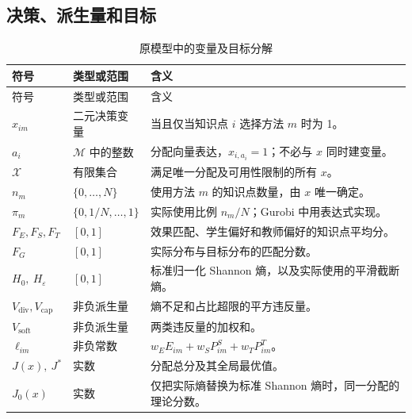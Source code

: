\documentclass[UTF8,11pt,a4paper,fontset=fandol]{ctexart}
\newcommand{\M}{\mathcal M}
\newcommand{\X}{\mathcal X}
\begin{document}
\subsection{决策、派生量和目标}
\small
\begin{longtable}{p{}p{}p{}}
\caption{原模型中的变量及目标分解}\\
\toprule 符号 & 类型或范围 & 含义 \\ \midrule\endfirsthead
\toprule 符号 & 类型或范围 & 含义 \\ \midrule\endhead
\bottomrule\endfoot
$x_{im}$ & 二元决策变量 & 当且仅当知识点 $i$ 选择方法 $m$ 时为 1。\\
$a_i$ & $\M$ 中的整数 & 分配向量表达，$x_{i,a_i}=1$；不必与 $x$ 同时建变量。\\
$\X$ & 有限集合 & 满足唯一分配及可用性限制的所有 $x$。\\
$n_m$ & $\{0,\ldots,N\}$ & 使用方法 $m$ 的知识点数量，由 $x$ 唯一确定。\\
$\pi_m$ & $\{0,1/N,\ldots,1\}$ & 实际使用比例 $n_m/N$；Gurobi 中用表达式实现。\\
$F_E,F_S,F_T$ & $[0,1]$ & 效果匹配、学生偏好和教师偏好的知识点平均分。\\
$F_G$ & $[0,1]$ & 实际分布与目标分布的匹配分数。\\
$H_0,\ H_\varepsilon$ & $[0,1]$ & 标准归一化 Shannon 熵，以及实际使用的平滑截断熵。\\
$V_{\mathrm{div}},V_{\mathrm{cap}}$ & 非负派生量 & 熵不足和占比超限的平方违反量。\\
$V_{\mathrm{soft}}$ & 非负派生量 & 两类违反量的加权和。\\
$\ell_{im}$ & 非负常数 & $w_EE_{im}+w_SP^S_{im}+w_TP^T_{im}$。\\
$J(x),\ J^*$ & 实数 & 分配总分及其全局最优值。\\
$J_0(x)$ & 实数 & 仅把实际熵替换为标准 Shannon 熵时，同一分配的理论分数。\\
\end{longtable}
\normalsize
\end{document}
